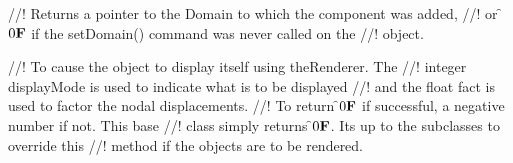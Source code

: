 //! Returns a pointer to the Domain to which the component was added,
//! or \f$0{\bf F}$ if the setDomain() command was never called on the
//! object.

//! To cause the object to display itself using \p theRenderer. The
//! integer \p displayMode is used to indicate what is to be displayed
//! and the float \p fact is used to factor the nodal displacements. 
//! To return \f$0{\bf F}$ if successful, a negative number if not. This base
//! class simply returns \f$0{\bf F}$. Its up to the subclasses to override this
//! method if the objects are to be rendered.

